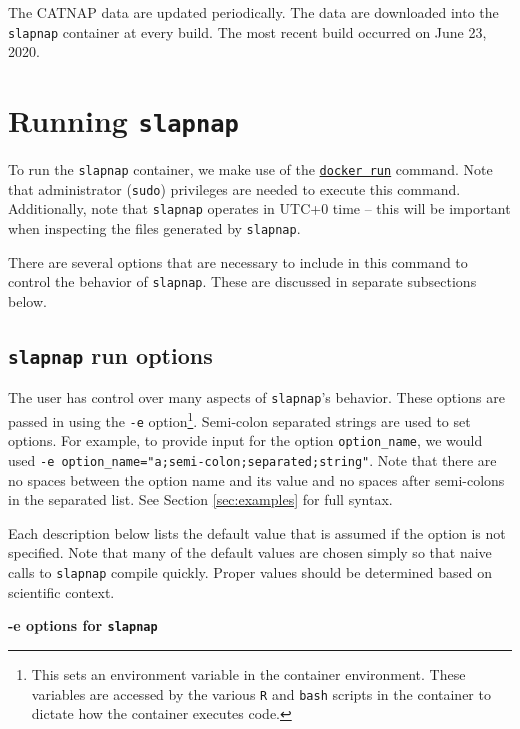 \documentclass[]{article}
\begin{document}
The CATNAP data are updated periodically. The data are downloaded into
the \texttt{slapnap} container at every build. The most recent build
occurred on June 23, 2020.

\section{\texorpdfstring{Running
\texttt{slapnap}}{Running slapnap}}\label{sec:runningcontainer}

To run the \texttt{slapnap} container, we make use of the
\href{https://docs.docker.com/engine/reference/run/}{\texttt{docker\ run}}
command. Note that administrator (\texttt{sudo}) privileges are needed
to execute this command. Additionally, note that \texttt{slapnap}
operates in UTC+0 time -- this will be important when inspecting the
files generated by \texttt{slapnap}.

There are several options that are necessary to include in this command
to control the behavior of \texttt{slapnap}. These are discussed in
separate subsections below.

\subsection{\texorpdfstring{\texttt{slapnap} run
options}{slapnap run options}}\label{sec:opts}

The user has control over many aspects of \texttt{slapnap}'s behavior.
These options are passed in using the \texttt{-e} option\footnote{This
  sets an environment variable in the container environment. These
  variables are accessed by the various \texttt{R} and \texttt{bash}
  scripts in the container to dictate how the container executes code.}.
Semi-colon separated strings are used to set options. For example, to
provide input for the option \texttt{option\_name}, we would used
\texttt{-e\ option\_name="a;semi-colon;separated;string"}. Note that
there are no spaces between the option name and its value and no spaces
after semi-colons in the separated list. See Section \ref{sec:examples}
for full syntax.

Each description below lists the default value that is assumed if the
option is not specified. Note that many of the default values are chosen
simply so that naive calls to \texttt{slapnap} compile quickly. Proper
values should be determined based on scientific context.

\textbf{-e options for \texttt{slapnap}}
\end{document}
